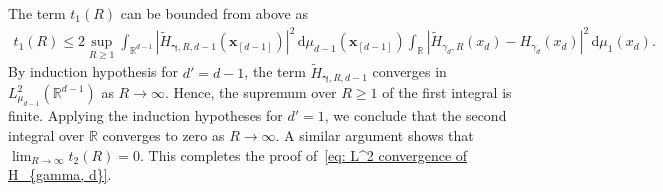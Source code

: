 \documentclass[namedate,webpdf]{ima-authoring-template-blank}
\def\D{\,\mathrm{d}}
\newcommand{\abs}[1]{\left|#1\right|}
\numberwithin{counter}{section}
\numberwithin{equation}{section}
\theoremstyle{plain}
\theoremstyle{definition}
\newcommand*{\bbR}{\mathbb{R}}
\newcommand*{\wtH}{\widetilde{H}}
\theoremstyle{thmstyletwo}
\begin{document}
The term \(t_1(R)\) can be bounded from above as 
\begin{multline*}
    t_1(R)
    \leq 2  \sup_{R \geq 1} \int_{\bbR^{d-1}} \abs{\wtH_{\bm{\gamma}, R, d-1}(\bm{x}_{[d-1]})}^2 \D \mu_{d-1}(\bm{x}_{[d-1]})   \int_{\bbR} \abs{\wtH_{\gamma_d,R}(x_d) - H_{\gamma_d}(x_d)}^2 \D \mu_1(x_d).
\end{multline*}
By induction hypothesis for \(d' = d-1\), the term \(\wtH_{\bm{\gamma}, R, d-1}\) converges in \(L_{\mu_{d-1}}^2(\bbR^{d-1})\) as \(R \to \infty\). Hence, the supremum over \(R \geq 1\) of the first integral is finite. Applying the induction hypotheses for \(d' = 1\), we conclude that the second integral over \(\bbR\) converges to zero as \(R \to \infty\).
A similar argument shows that \(\lim_{R \to \infty} t_2(R) = 0\). This completes the proof of~\eqref{eq: L^2 convergence of H_{gamma, d}}.
\end{document}
